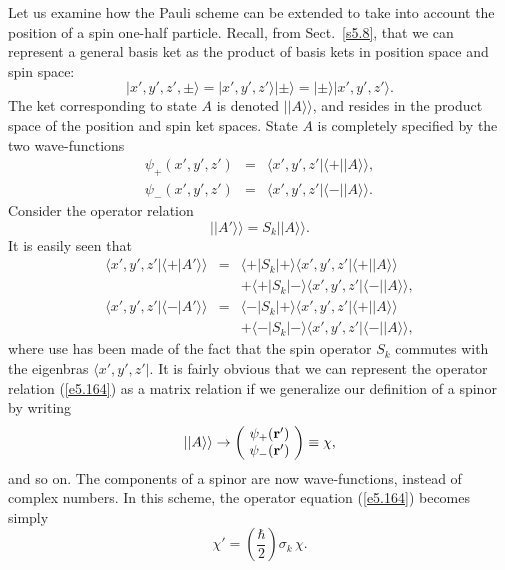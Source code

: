 Let us examine how the Pauli scheme can be extended to take into account the
position of a spin one-half particle. Recall, from Sect.~\ref{s5.8},
that we can represent a general basis ket  as the product
of basis kets in position space and  spin space:
\begin{equation}
|x', y', z', \pm\rangle = |x',y',z'\rangle |\pm \rangle = |\pm \rangle|
x',y',z'\rangle .
\end{equation}
The ket corresponding to state $A$ is denoted $||A\rangle\rangle$, and resides
in the product space of the position and spin ket spaces. State $A$ is completely
specified by the two wave-functions
\begin{eqnarray}
\psi_+(x', y', z') &=& \langle x',y', z'|\langle +||A\rangle\rangle,\\[0.5ex]
\psi_-(x', y', z') &=& \langle x',y',z'|\langle -||A\rangle\rangle.
\end{eqnarray}
Consider the operator relation
\begin{equation}\label{e5.164}
||A'\rangle\rangle = S_k ||A\rangle\rangle.
\end{equation}
It is easily seen that 
\begin{eqnarray}
\langle x', y', z'| \langle +|A'\rangle\rangle &=&
\langle + |S_k |+\rangle \langle x',y',z'|\langle +||A\rangle\rangle\nonumber\\[0.5ex]
&&+\langle + |S_k |-\rangle \langle x',y',z'|\langle -||A\rangle\rangle,\\[0.5ex]
\langle x', y', z'| \langle -|A'\rangle\rangle &=&
\langle - |S_k |+\rangle \langle x',y',z'|\langle +||A\rangle\rangle\nonumber\\[0.5ex]
&&+\langle -
|S_k |-\rangle \langle x',y',z'|\langle -||A\rangle\rangle,
\end{eqnarray}
where use has been made of the fact that the spin operator $S_k$  commutes with the
eigenbras $\langle x', y', z'|$. 
It is fairly obvious  that we can represent the operator relation (\ref{e5.164}) as a matrix relation
if we generalize our definition of a spinor by writing
\begin{equation}\label{e5.166}
||A\rangle\rangle \rightarrow \left(\! \begin{array}{c}\psi_+({\bf r}') \\
\psi_-({\bf r}')\end{array}\!\right)\equiv \chi,
\end{equation}
and so on. The components of a spinor are now wave-functions, instead of 
complex numbers. In this scheme, the operator equation (\ref{e5.164})  becomes simply
\begin{equation}
\chi' = \left(\frac{\hbar}{2}\right) \sigma_k \,\chi.
\end{equation}

